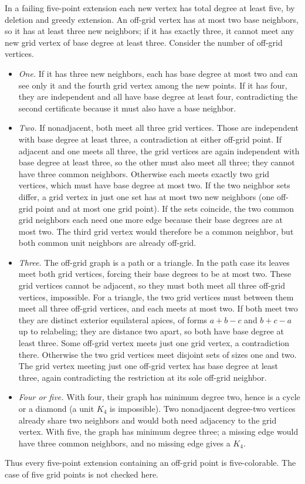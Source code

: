 \documentclass[11pt,letterpaper]{article}
\begin{document}
In a failing five-point extension each new vertex has total degree
at least five, by deletion and greedy extension. An off-grid vertex
has at most two base neighbors, so it has at least three new
neighbors; if it has exactly three, it cannot meet any new grid
vertex of base degree at least three. Consider the number of
off-grid vertices.
\begin{itemize}
\item \emph{One.} If it has three new neighbors, each has base degree
at most two and can see only it and the fourth grid vertex among
the new points. If it has four, they are independent and all have
base degree at least four, contradicting the second certificate
because it must also have a base neighbor.
\item \emph{Two.} If nonadjacent, both meet all three grid vertices.
Those are independent with base degree at least three, a contradiction
at either off-grid point. If adjacent and one meets all three, the
grid vertices are again independent with base degree at least three,
so the other must also meet all three; they cannot have three
common neighbors. Otherwise each meets exactly two grid vertices,
which must have base degree at most two. If the two neighbor sets
differ, a grid vertex in just one set has at most two new neighbors
(one off-grid point and at most one grid point). If the sets
coincide, the two common grid neighbors each need one more edge
because their base degrees are at most two. The third grid vertex
would therefore be a common neighbor, but both common unit
neighbors are already off-grid.
\item \emph{Three.} The off-grid graph is a path or a triangle. In
the path case its leaves meet both grid vertices, forcing their
base degrees to be at most two. These grid vertices cannot be adjacent,
so they must both meet all three off-grid vertices, impossible.
For a triangle, the two grid vertices must between them meet
all three off-grid vertices, and each meets at most two.
If both meet two they are distinct exterior equilateral apices,
of forms $a+b-c$ and $b+c-a$ up to relabeling; they are distance two
apart, so both have base degree at least three. Some off-grid
vertex meets just one grid vertex, a contradiction there.
Otherwise the two grid vertices meet disjoint sets of sizes one and
two. The grid vertex meeting just one off-grid vertex has
base degree at least three, again contradicting the restriction
at its sole off-grid neighbor.
\item \emph{Four or five.} With four, their graph has minimum degree
two, hence is a cycle or a diamond (a unit $K_4$ is impossible).
Two nonadjacent degree-two vertices already share two neighbors
and would both need adjacency to the grid vertex. With five, the
graph has minimum degree three; a missing edge would have three
common neighbors, and no missing edge gives a $K_4$.
\end{itemize}
Thus every five-point extension containing an off-grid point
is five-colorable. The case of five grid points is not checked here.
\end{document}

